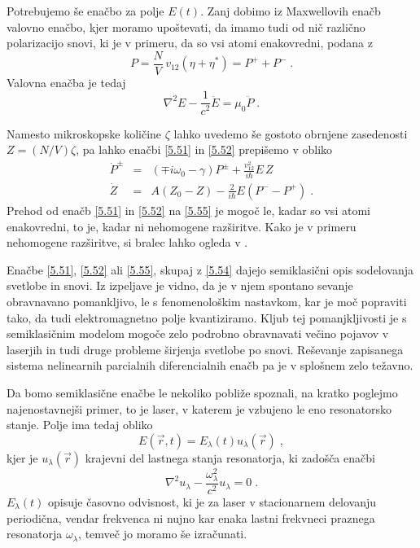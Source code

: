 Potrebujemo še enačbo za polje $E(t)$. Zanj dobimo iz Maxwellovih enačb
valovno enačbo, kjer moramo upoštevati, da imamo tudi od nič različno
polarizacijo snovi, ki je v primeru, da so vsi atomi enakovredni, podana z 
\begin{equation}  \label{5.53}
P=\frac{N}{V}\,v_{12}(\eta+\eta^{\ast})=P^++P^-\;.
\end{equation}
Valovna enačba je tedaj \cite{empolje} 
\begin{equation}  \label{5.54}
\nabla^2 E-\frac{1}{c^2}\ddot{E}=\mu_0 \ddot{P}\;.
\end{equation}

Namesto mikroskopske količine $\zeta$ lahko uvedemo še gostoto obrnjene
zasedenosti $Z=(N/V)\zeta$, pa lahko enačbi \ref{5.51} in \ref{5.52}
prepišemo v obliko 
\begin{eqnarray}  \label{5.56}
\dot{P}^{\pm}&=&(\mp i \omega_0-\gamma)P^{\pm}+ \frac{v_{12}^2}{i\hbar} E\,Z
\\
\dot{Z}&=&A(Z_0-Z)-\frac{2}{i\hbar}E(P^--P^+)\;.
\end{eqnarray}
Prehod od enačb \ref{5.51} in \ref{5.52} na \ref{5.55} je mogoč le, kadar
so vsi atomi enakovredni, to je, kadar ni nehomogene razširitve. Kako je v
primeru nehomogene razširitve, si bralec lahko ogleda v \cite{haken2}.

Enačbe \ref{5.51}, \ref{5.52} ali \ref{5.55}, skupaj z \ref{5.54} dajejo
semiklasični opis sodelovanja svetlobe in snovi. Iz izpeljave je vidno, da
je v njem spontano sevanje obravnavano pomankljivo, le s fenomenološkim
na\-stavkom, kar je moč popraviti tako, da tudi elektromagnetno polje
kvantiziramo. Kljub tej pomanjkljivosti je s semiklasičnim modelom mogoče
zelo podrobno obravnavati večino pojavov v laserjih in tudi druge probleme
širjenja svetlobe po snovi. Reševanje zapisanega sistema nelinearnih
parcialnih diferencialnih enačb pa je v splošnem zelo težavno.

Da bomo semiklasične enačbe le nekoliko pobliže spoznali, na kratko
poglejmo najenostavnejši primer, to je laser, v katerem je vzbujeno le eno
resonatorsko stanje. Polje ima tedaj obliko 
\begin{equation}  \label{5.57}
E(\vec{r},t)=E_{\lambda}(t)u_{\lambda}(\vec{r})\;,
\end{equation}
kjer je $u_{\lambda}(\vec{r})$ krajevni del lastnega stanja resonatorja, ki
zadošča enačbi 
\begin{equation}  \label{5.58}
\nabla^2 u_{\lambda}- \frac{\omega_{\lambda}^2}{c^2}u_{\lambda}=0\;.
\end{equation}
$E_{\lambda}(t)$ opisuje časovno odvisnost, ki je za laser v stacionarnem
delovanju periodična, vendar frekvenca ni nujno kar enaka lastni frekvneci
praznega resonatorja $\omega_{\lambda}$, temveč jo moramo še izračunati.

